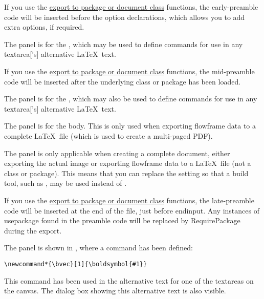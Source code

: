 If you use the \hyperref[sec:exportsty]{export to package or document
class} functions, the \gls{early-preamble} code will be
inserted before the option declarations, which allows you to add
extra options, if required.


The  panel is for the
, which may be used to define
commands for use in any \gls{textarea}['s] alternative \LaTeX\ text.

If you use the \hyperref[sec:exportsty]{export to package or document
class} functions, the \gls{mid-preamble} code will be inserted after
the underlying class or package has been loaded.


The  panel is for the
, which may also be used to define
commands for use in any \gls{textarea}['s] alternative \LaTeX\ text.


The  panel is for the
 body. This is only used when
exporting \gls{flowframe} data to a complete \LaTeX\ file
(which is used to create a multi-paged PDF).


The  panel is only
applicable when creating a complete document, either exporting the
actual image or exporting \gls{flowframe} data to a \LaTeX\ file
(not a class or package). This means that you can replace the
 setting so that a build tool, such as
, may be used instead of .


If you use the \hyperref[sec:exportsty]{export to package or document
class} functions, the \gls{late-preamble} code will be inserted 
at the end of the file, just before
\gls{endinput}. Any instances of \gls{usepackage} found in
the preamble code will be replaced by \gls{RequirePackage}
during the export.

The  panel is shown in ,
where a command has been defined:
\begin{verbatim}
\newcommand*{\bvec}[1]{\boldsymbol{#1}}
\end{verbatim}
This command has been used in the alternative text for one of the
\glspl{textarea} on the \gls{canvas}. The dialog box showing this
alternative text is also visible.

